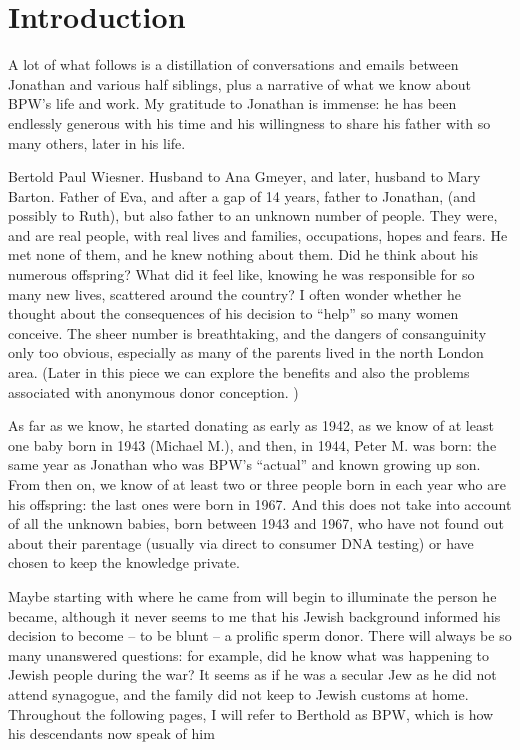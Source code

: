 \chapter{Introduction}

A lot of what follows is a distillation of conversations and emails between Jonathan and various half siblings, plus a narrative of what we know about BPW’s life and work.  My gratitude to Jonathan is immense: he has been endlessly generous with his time and his willingness to share his father with so many others, later in his life.

Bertold Paul Wiesner. Husband to Ana Gmeyer, and later, husband to Mary Barton. Father of Eva, and after a gap of 14 years, father to Jonathan, (and possibly to Ruth), but also father to an unknown number of people. They were, and are real people, with real lives and families, occupations, hopes and fears. He met none of them, and he knew nothing about them. Did he think about his numerous offspring? What did it feel like, knowing he was responsible for so many new lives, scattered around the country? I often wonder whether he thought about the consequences of his decision to “help” so many women conceive. The sheer number is breathtaking, and the dangers of consanguinity only too obvious, especially as many of the parents lived in the north London area. (Later in this piece we can explore the benefits and also the problems associated with anonymous donor conception. )

As far as we know, he started donating as early as 1942, as we know of at least one baby born in 1943 (Michael M.), and then, in 1944, Peter M. was born: the same year as Jonathan who was BPW’s “actual” and known growing up son. From then on, we know of at least two or three people born in each year who are his offspring: the last ones were born in 1967. And this does not take into account of all the unknown babies, born between 1943 and 1967, who have not found out about their parentage (usually via direct to consumer DNA testing) or have chosen to keep the knowledge private.

Maybe starting with where he came from will begin to illuminate the person he became, although it never seems to me that his Jewish background informed his decision to become – to be blunt – a prolific sperm donor. There will always be so many unanswered questions: for example, did he know what was happening to Jewish people during the war? It seems as if he was a secular Jew as he did not attend synagogue, and the family did not keep to Jewish customs at home. Throughout the following pages, I will refer to Berthold as BPW, which is how his descendants now speak of him
